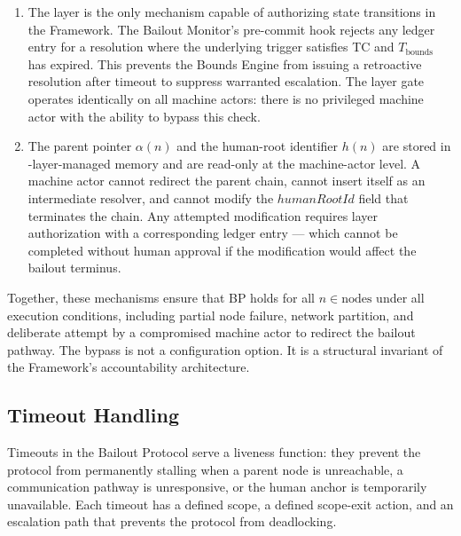 \begin{enumerate}
\item[\textbf{Fact Layer gate (enforcement at the authorization layer).}] The \fact{} layer is the only mechanism capable of authorizing state transitions in the \bxthree{} Framework. The Bailout Monitor's pre-commit hook rejects any ledger entry for a resolution where the underlying trigger satisfies TC and $T_{\text{bounds}}$ has expired. This prevents the Bounds Engine from issuing a retroactive resolution after timeout to suppress warranted escalation. The \fact{} layer gate operates identically on all machine actors: there is no privileged machine actor with the ability to bypass this check.

\item[\textbf{Immutable parent-pointer and human-root architecture (enforcement at the data model layer).}] The parent pointer $\alpha(n)$ and the human-root identifier $h(n)$ are stored in \fact-layer-managed memory and are read-only at the machine-actor level. A machine actor cannot redirect the parent chain, cannot insert itself as an intermediate resolver, and cannot modify the $humanRootId$ field that terminates the chain. Any attempted modification requires \purpose{} layer authorization with a corresponding ledger entry --- which cannot be completed without human approval if the modification would affect the bailout terminus.
\end{enumerate}

Together, these mechanisms ensure that BP holds for all $n \in \text{nodes}$ under all execution conditions, including partial node failure, network partition, and deliberate attempt by a compromised machine actor to redirect the bailout pathway. The bypass is not a configuration option. It is a structural invariant of the \bxthree{} Framework's accountability architecture.

\subsection{Timeout Handling}\label{sec:timeout-handling}

Timeouts in the Bailout Protocol serve a liveness function: they prevent the protocol from permanently stalling when a parent node is unreachable, a communication pathway is unresponsive, or the human anchor is temporarily unavailable. Each timeout has a defined scope, a defined scope-exit action, and an escalation path that prevents the protocol from deadlocking.

